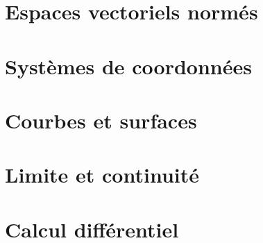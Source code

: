 \section{Espaces vectoriels normés}


\section{Systèmes de coordonnées}


\section{Courbes et surfaces}



\section{Limite et continuité}



\section{Calcul différentiel}



